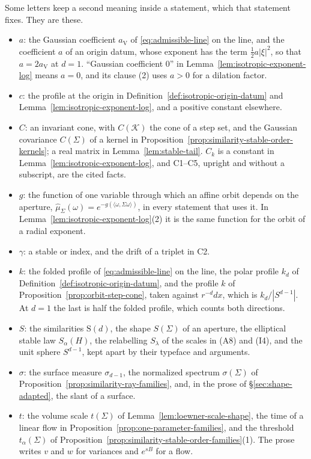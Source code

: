 Some letters keep a second meaning inside a statement, which that statement fixes. They are these.
\begin{itemize}
\item $a$: the Gaussian coefficient $a_{\mathrm V}$ of \ref{eq:admissible-line} on the line, and the
coefficient $a$ of an origin datum, whose exponent has the term $\tfrac12a|\xi|^2$, so that
$a = 2a_{\mathrm V}$ at $d = 1$. ``Gaussian coefficient $0$'' in
Lemma~\ref{lem:isotropic-exponent-log} means $a = 0$, and its clause (2) uses $a > 0$ for a dilation
factor.
\item $c$: the profile at the origin in Definition~\ref{def:isotropic-origin-datum} and
Lemma~\ref{lem:isotropic-exponent-log}, and a positive constant elsewhere.
\item $C$: an invariant cone, with $C(\mathcal K)$ the cone of a step set, and the Gaussian covariance
$C(\Sigma)$ of a kernel in Proposition~\ref{prop:similarity-stable-order-kernels}; a real matrix in
Lemma~\ref{lem:stable-tail}. $C_k$ is a
constant in Lemma~\ref{lem:isotropic-exponent-log}, and C1--C5, upright and without a subscript, are
the cited facts.
\item $g$: the function of one variable through which an affine orbit depends on the aperture,
$\widehat\mu_\Sigma(\omega) = e^{-g(\langle\omega,\Sigma\omega\rangle)}$, in every statement that uses
it. In Lemma~\ref{lem:isotropic-exponent-log}(2) it is the same function for the orbit of a radial
exponent.
\item $\gamma$: a stable or \Matern{} index, and the drift of a triplet in C2.
\item $k$: the folded profile of \ref{eq:admissible-line} on the line, the polar profile $k_d$ of
Definition~\ref{def:isotropic-origin-datum}, and the profile $k$ of
Proposition~\ref{prop:orbit-step-cone}, taken against $r^{-d}dx$, which is $k_d/|S^{d-1}|$. At $d = 1$
the last is half the folded profile, which counts both directions.
\item $S$: the similarities $\mathrm S(d)$, the shape $S(\Sigma)$ of an aperture, the elliptical stable
law $S_\alpha(H)$, the relabelling $S_\lambda$ of the scales in (A8) and (I4), and the unit sphere
$S^{d-1}$, kept apart by their typeface and arguments.
\item $\sigma$: the surface measure $\sigma_{d-1}$, the normalized spectrum $\sigma(\Sigma)$ of
Proposition~\ref{prop:similarity-ray-families}, and, in the prose of \S\ref{sec:shape-adapted}, the
slant of a surface.
\item $t$: the volume scale $t(\Sigma)$ of Lemma~\ref{lem:loewner-scale-shape}, the time of a linear flow
in Proposition~\ref{prop:one-parameter-families}, and the threshold $t_\alpha(\Sigma)$ of
Proposition~\ref{prop:similarity-stable-order-families}(1). The prose writes $v$ and $w$ for variances
and $e^{sB}$ for a flow.
\end{itemize}

